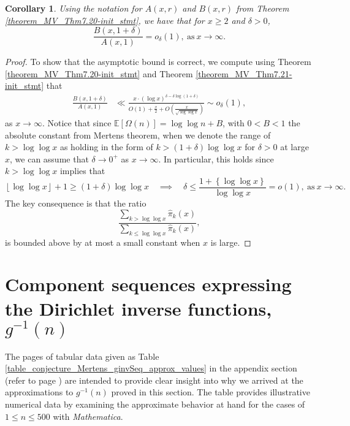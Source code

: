 \documentclass[11pt,reqno,a4letter]{article}
\numberwithin{figure}{section}
\numberwithin{table}{section}
\newcommand{\floor}[1]{\left\lfloor #1 \right\rfloor}
\theoremstyle{plain}
\newtheorem{cor}[theorem]{Corollary}
\numberwithin{theorem}{section}
\theoremstyle{definition}
\begin{document}
\begin{cor} 
\label{theorem_MV_Thm7.20} 
Using the notation for $A(x, r)$ and $B(x, r)$ from 
Theorem \ref{theorem_MV_Thm7.20-init_stmt}, 
we have that for $x \geq 2$ and $\delta > 0$, 
\[
\frac{B(x, 1+\delta)}{A(x, 1)} = o_{\delta}(1), 
     \mathrm{\ as\ } x \rightarrow \infty. 
\]
\end{cor} 
\begin{proof} 
To show that the asymptotic bound is correct, we compute using 
Theorem \ref{theorem_MV_Thm7.20-init_stmt} and 
Theorem \ref{theorem_MV_Thm7.21-init_stmt} that 
\begin{align*} 
\frac{B(x, 1+\delta)}{A(x, 1)} & \ll 
     \frac{x \cdot (\log x)^{\delta - \delta\log(1+\delta)}}{ 
     O(1) + \frac{x}{2} + 
     O\left(\frac{x}{\sqrt{\log\log x}}\right)} 
     \sim 
     o_{\delta}(1),  
\end{align*} 
as $x \rightarrow \infty$. Notice that since $\mathbb{E}[\Omega(n)] = \log\log n + B$, with $0 < B < 1$ the 
absolute constant from Mertens theorem, 
when we denote the range of $k > \log\log x$ as holding in the form of 
$k > (1 + \delta) \log\log x$ for $\delta > 0$ at large $x$, we can assume that 
$\delta \rightarrow 0^{+}$ as $x \rightarrow \infty$. 
In particular, this holds since $k > \log\log x$ implies that 
\[
\floor{\log\log x} + 1 \geq (1 + \delta) \log\log x \quad\implies\quad 
     \delta \leq \frac{1 + \left\{\log\log x\right\}}{\log\log x} = o(1), 
     \mathrm{\ as\ } x \rightarrow \infty. 
\] 
The key consequence is that the ratio 
\[
\frac{\sum\limits_{k > \log\log x} \widehat{\pi}_k(x)}{\sum\limits_{k \leq \log\log x} \widehat{\pi}_k(x)}, 
\] 
is bounded above by at most a small constant when $x$ is large. 
\end{proof} 

\newpage
\section{Component sequences expressing the Dirichlet inverse functions, $g^{-1}(n)$} 
\label{Section_InvFunc_PreciseExpsAndAsymptotics} 

The pages of tabular data given as Table \ref{table_conjecture_Mertens_ginvSeq_approx_values} 
in the appendix section (refer to 
page \pageref{table_conjecture_Mertens_ginvSeq_approx_values}) are intended to 
provide clear insight into why we arrived at the approximations to 
$g^{-1}(n)$ proved in this section. The table provides illustrative 
numerical data by examining the approximate behavior 
at hand for the cases of $1 \leq n \leq 500$ with \emph{Mathematica}. 
\end{document}
